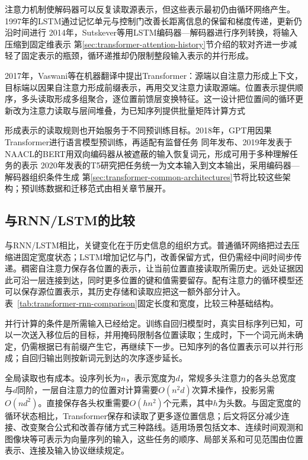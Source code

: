 注意力机制使解码器可以反复读取源表示，但这些表示最初仍由循环网络产生。1997年的LSTM通过记忆单元与控制门改善长距离信息的保留和梯度传递，更新仍沿时间进行 2014年，Sutskever等用LSTM编码器—解码器进行序列转换，将输入压缩到固定维表示 第\ref{sec:transformer-attention-history}节介绍的软对齐进一步减轻了固定表示的瓶颈，循环递推却仍限制整段输入表示的并行形成。

2017年，Vaswani等在机器翻译中提出Transformer：源端以自注意力形成上下文，目标端以因果自注意力形成前缀表示，再用交叉注意力读取源端。位置表示提供顺序，多头读取形成多组聚合，逐位置前馈层变换特征。这一设计把位置间的循环更新改为注意力读取与层间堆叠，为已知序列提供批量矩阵计算方式

形成表示的读取规则也开始服务于不同预训练目标。2018年，GPT用因果Transformer进行语言模型预训练，再适配有监督任务 同年发布、2019年发表于NAACL的BERT用双向编码器从被遮蔽的输入恢复词元，形成可用于多种理解任务的表示 2020年发表的T5研究把任务统一为文本输入到文本输出，采用编码器—解码器组织条件生成 第\ref{sec:transformer-common-architectures}节将比较这些架构；预训练数据和迁移范式由相关章节展开。

\subsection{与RNN/LSTM的比较}
\label{sec:transformer-recurrent-comparison}

与RNN/LSTM相比，关键变化在于历史信息的组织方式。普通循环网络把过去压缩进固定宽度状态；LSTM增加记忆与门，改善保留方式，但仍需经中间时间步传递。稠密自注意力保存各位置的表示，让当前位置直接读取所需历史。远处证据因此可沿一层连接到达，同时更多位置的键和值需要留存。配有注意力的循环模型还可以保存源位置表示，其历史存储和读取应把这一额外部分计入。表~\ref{tab:transformer-rnn-comparison}固定长度和宽度，比较三种基础结构。

并行计算的条件是所需输入已经给定。训练自回归模型时，真实目标序列已知，可以一次送入移位后的目标，并用掩码限制各位置读取；生成时，下一个词元尚未确定，仍需根据已有前缀产生它，再继续下一步。已知序列的各位置表示可以并行形成；自回归输出则按新词元到达的次序逐步延长。

全局读取也有成本。设序列长为$n$，表示宽度为$d$，常规多头注意力的各头总宽度与$d$同阶，一层自注意力的位置对计算需要$O(n^2d)$次算术操作，投影另需$O(nd^2)$。直接保存各头权重需要$O(hn^2)$个元素，其中$h$为头数。与固定宽度的循环状态相比，Transformer保存和读取了更多逐位置信息；后文将区分减少连接、改变聚合公式和改善存储方式三种路线。适用场景包括文本、连续时间观测和图像块等可表示为向量序列的输入，这些任务的顺序、局部关系和可见范围由位置表示、连接及输入协议继续规定。

